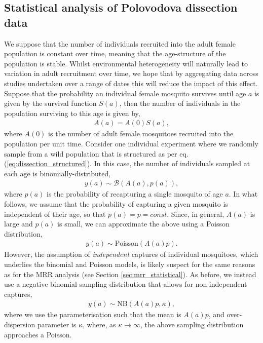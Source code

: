 \documentclass[12pt]{article}
\begin{document}
{\subsection{Statistical analysis of Polovodova dissection data}\label{sec:dissection_dissectionStats}
We suppose that the number of individuals recruited into the adult female population is constant over time, meaning that the age-structure of the population is stable. Whilst environmental heterogeneity will naturally lead to variation in adult recruitment over time, we hope that by aggregating data across studies undertaken over a range of dates this will reduce the impact of this effect. Suppose that the probability an individual female mosquito survives until age $a$ is given by the survival function $S(a)$, then the number of individuals in the population surviving to this age is given by,
%
\begin{align}\label{eq:dissection_structured}
A(a) = A(0) S(a),
\end{align}
%
where $A(0)$ is the number of adult female mosquitoes recruited into the population per unit time. Consider one individual experiment where we randomly sample from a wild population that is structured as per eq. (\ref{eq:dissection_structured}). In this case, the number of individuals sampled at each age is binomially-distributed,
%
\begin{align}
y(a) \sim \mathcal{B}(A(a),p(a)),
\end{align} 
%
where $p(a)$ is the probability of recapturing a single mosquito of age $a$. In what follows, we assume that the probability of capturing a given mosquito is independent of their age, so that $p(a)=p=const$. Since, in general, $A(a)$ is large and $p(a)$ is small, we can approximate the above using a Poisson distribution,
%
\begin{align}
y(a) \sim \text{Poisson}(A(a)p).
\end{align}
%
However, the assumption of \textit{independent} captures of individual mosquitoes, which underlies the binomial and Poisson models, is likely suspect for the same reasons as for the MRR analysis (see Section \ref{sec:mrr_statistical}). As before, we instead use a negative binomial sampling distribution that allows for non-independent captures,
%
\begin{align}
y(a) \sim \text{NB}(A(a)p,\kappa),
\end{align} 
%
where we use the parameterisation such that the mean is $A(a)p$, and over-dispersion parameter is $\kappa$, where, as $\kappa\rightarrow \infty$, the above sampling distribution approaches a Poisson.

}
\end{document}
